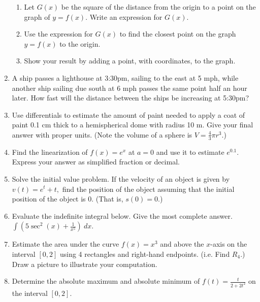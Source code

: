 \documentclass[12pt]{article}
\begin{document}
\begin{enumerate}
\begin{enumerate}
\item  Let $G(x)$ be the square of the distance from the origin to a point on the graph of $y=f(x)$.  Write an expression for $G(x)$.

\item Use the expression for $G(x)$ to find the closest point on the graph $y=f(x)$ to the origin.

\item  Show your result by adding a point, with coordinates, to the graph.
\end{enumerate}

\item A ship passes a lighthouse at 3:30pm, sailing to the east at 5 mph, while another ship sailing due south at 6 mph passes the same point half an hour later.  How fast will the distance between the ships be increasing at 5:30pm?
\item Use differentials to estimate the amount of paint needed to apply a coat of paint 0.1 cm thick to a hemispherical dome with radius 10 m. Give your final answer with proper units. (Note the volume of a sphere is $V=\frac{4}{3} \pi r^3.$)
\item Find the linearization of $f(x)=e^x$ at $a=0$ and use it to estimate $e^{0.1}.$ Express your answer as simplified fraction or decimal.
\item Solve the initial value problem. If the velocity of an object is given by $v(t)=e^{t} +t,$ find the position of the object assuming that the initial position of the object is $0.$ (That is, $s(0)=0.$)
\item Evaluate the indefinite integral below. Give the most complete answer.
$\int (5\sec^2(x) + \frac{1}{x^5}) \: dx$.
\item Estimate the area under the curve $f(x)=x^3$ and above the $x$-axis on the interval $[0,2]$ using 4 rectangles and right-hand endpoints. (i.e. Find $R_4.$) Draw a picture to illustrate your computation.
\item Determine the absolute maximum and absolute minimum of $f(t)=\frac{{t}}{2+2t^2}$ on the interval $[0,2].$
\end{enumerate}
\end{document}
